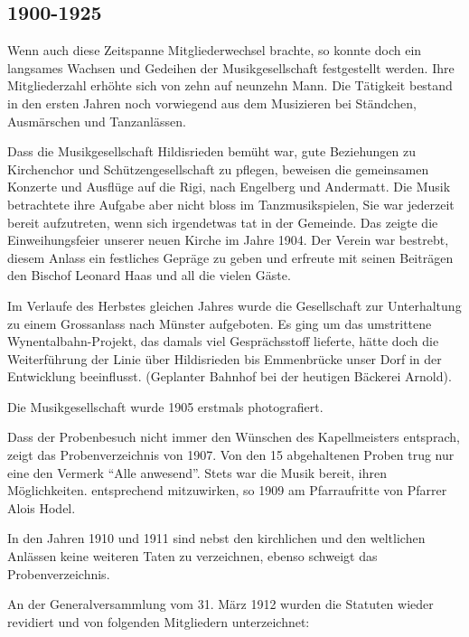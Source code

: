 \begin{multicols}{2}

    \subsection{1900-1925}

    Wenn auch diese Zeitspanne Mitgliederwechsel brachte,
    so konnte doch ein langsames Wachsen und Gedeihen
    der Musikgesellschaft festgestellt werden. Ihre Mitgliederzahl erhöhte sich von zehn auf neunzehn Mann.
    Die Tätigkeit bestand in den ersten Jahren noch vorwiegend aus dem Musizieren bei Ständchen, Ausmärschen
    und Tanzanlässen.

    Dass die Musikgesellschaft Hildisrieden bemüht war,
    gute Beziehungen zu Kirchenchor und Schützengesellschaft zu pflegen,
    beweisen die gemeinsamen Konzerte und Ausflüge auf die Rigi, nach Engelberg und
    Andermatt. Die Musik betrachtete ihre Aufgabe aber
    nicht bloss im Tanzmusikspielen, Sie war jederzeit bereit aufzutreten, wenn sich irgendetwas tat
    in der Gemeinde. Das zeigte die Einweihungsfeier unserer neuen
    Kirche im Jahre 1904. Der Verein war bestrebt, diesem Anlass ein festliches Gepräge zu geben und erfreute
    mit seinen Beiträgen den Bischof Leonard Haas und all die vielen Gäste.

    Im Verlaufe des Herbstes gleichen Jahres wurde die
    Gesellschaft zur Unterhaltung zu einem Grossanlass
    nach Münster aufgeboten. Es ging um das umstrittene Wynentalbahn-Projekt, das damals viel Gesprächsstoff
    lieferte, hätte doch die Weiterführung der Linie über
    Hildisrieden bis Emmenbrücke unser Dorf in der Entwicklung beeinflusst. (Geplanter Bahnhof bei der
    heutigen Bäckerei Arnold).

    Die Musikgesellschaft wurde 1905 erstmals photografiert.

    Dass der Probenbesuch nicht immer den Wünschen des Kapellmeisters entsprach,
    zeigt das Probenverzeichnis von 1907. Von den 15 abgehaltenen Proben trug
    nur eine den Vermerk "`Alle anwesend"'. Stets war die
    Musik bereit, ihren Möglichkeiten. entsprechend mitzuwirken, so 1909 am Pfarraufritte von Pfarrer Alois
    Hodel.

    In den Jahren 1910 und 1911 sind nebst den kirchlichen
    und den weltlichen Anlässen keine weiteren Taten zu verzeichnen,
    ebenso schweigt das Probenverzeichnis.

    An der Generalversammlung vom 31. März 1912 wurden die Statuten
    wieder revidiert und von folgenden Mitgliedern unterzeichnet:


\end{multicols}
